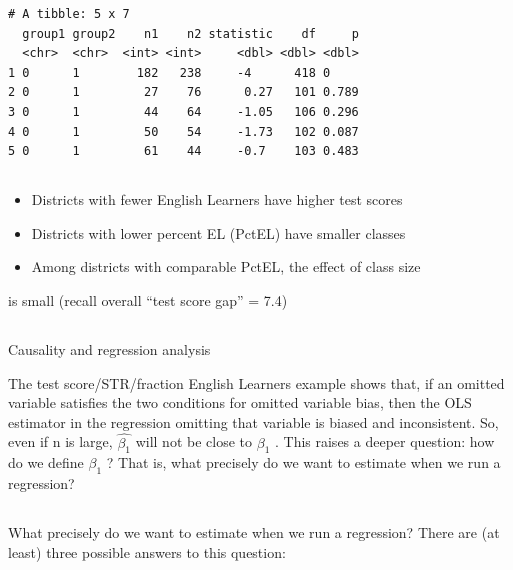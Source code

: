 \documentclass[
  letterpaper,
  DIV=11,
  numbers=noendperiod]{scrartcl}
\begin{document}
\begin{verbatim}
# A tibble: 5 x 7
  group1 group2    n1    n2 statistic    df     p
  <chr>  <chr>  <int> <int>     <dbl> <dbl> <dbl>
1 0      1        182   238     -4      418 0    
2 0      1         27    76      0.27   101 0.789
3 0      1         44    64     -1.05   106 0.296
4 0      1         50    54     -1.73   102 0.087
5 0      1         61    44     -0.7    103 0.483
\end{verbatim}

\hypertarget{section-2}{%
\subsection{}\label{section-2}}

\begin{itemize}
\item
  Districts with fewer English Learners have higher test scores
\item
  Districts with lower percent EL (PctEL) have smaller classes
\item
  Among districts with comparable PctEL, the effect of class size
\end{itemize}

is small (recall overall ``test score gap'' = 7.4)

\hypertarget{section-3}{%
\subsection{}\label{section-3}}

Causality and regression analysis

The test score/STR/fraction English Learners example shows that, if an
omitted variable satisfies the two conditions for omitted variable bias,
then the OLS estimator in the regression omitting that variable is
biased and inconsistent. So, even if n is large, \(\hat{\beta_1}\) will
not be close to \(\beta_1\) . This raises a deeper question: how do we
define \(\beta_1\) ? That is, what precisely do we want to estimate when
we run a regression?

\hypertarget{section-4}{%
\subsection{}\label{section-4}}

What precisely do we want to estimate when we run a regression? There
are (at least) three possible answers to this question:
\end{document}
